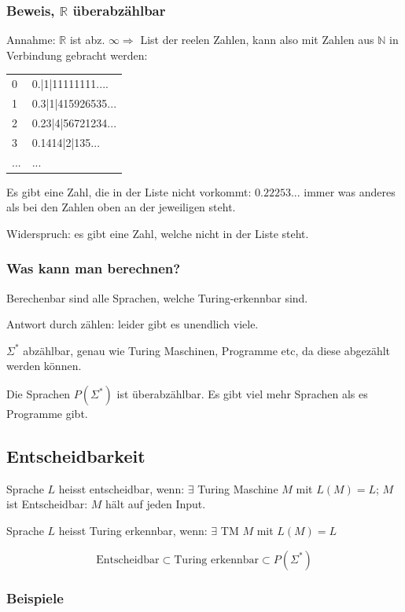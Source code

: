 \subsubsection{Beweis, $\mathbb{R}$ überabzählbar}

Annahme: $\mathbb{R}$ ist abz. $\infty \Rightarrow$ List der reelen Zahlen, kann also mit Zahlen aus $\mathbb{N}$ in Verbindung gebracht werden:

\begin{tabular}{l l}
	0 & 0.|1|11111111.... \\
	1 & 0.3|1|415926535... \\
	2 & 0.23|4|56721234... \\
	3 & 0.1414|2|135... \\
	... & ...
\end{tabular}

Es gibt eine Zahl, die in der Liste nicht vorkommt: $0.22253...$ immer was anderes als bei den Zahlen oben an der jeweiligen steht.

Widerspruch: es gibt eine Zahl, welche nicht in der Liste steht.


\subsubsection{Was kann man berechnen?}

Berechenbar sind alle Sprachen, welche Turing-erkennbar sind.

Antwort durch zählen: leider gibt es unendlich viele. 

$\Sigma^\ast$ abzählbar, genau wie Turing Maschinen, Programme etc, da diese abgezählt werden können.

Die Sprachen $P(\Sigma^\ast)$ ist überabzählbar. Es gibt viel mehr Sprachen als es Programme gibt.

\subsection{Entscheidbarkeit}

Sprache $L$ heisst entscheidbar, wenn: $\exists$ Turing Maschine $M$ mit $L(M) = L$; $M$ ist Entscheidbar: $M$ hält auf jeden Input.

Sprache $L$ heisst Turing erkennbar, wenn: $\exists$ TM $M$ mit $L(M)=L$

\[
	\text{Entscheidbar} \subset \text{Turing erkennbar} \subset P(\Sigma^\ast)
\]


\subsubsection{Beispiele}
	
